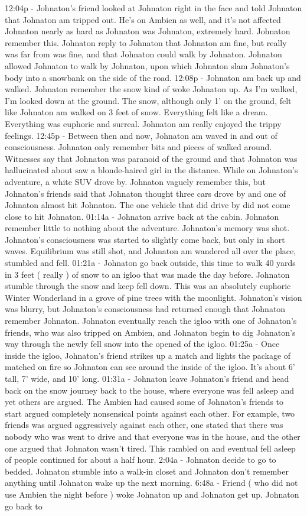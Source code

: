\documentclass[12pt]{book}
\begin{document}
12:04p - Johnaton's friend looked at Johnaton right in the face and told Johnaton that Johnaton am tripped out. He's on Ambien as well, and it's not affected Johnaton nearly as hard as Johnaton was Johnaton, extremely hard. Johnaton remember this. Johnaton reply to Johnaton that Johnaton am fine, but really was far from was fine, and that Johnaton could walk by Johnaton. Johnaton allowed Johnaton to walk by Johnaton, upon which Johnaton slam Johnaton's body into a snowbank on the side of the road. 12:08p - Johnaton am back up and walked. Johnaton remember the snow kind of woke Johnaton up. As I'm walked, I'm looked down at the ground. The snow, although only 1' on the ground, felt like Johnaton am walked on 3 feet of snow. Everything felt like a dream. Everything was euphoric and surreal. Johnaton am really enjoyed the trippy feelings. 12:45p - Between then and now, Johnaton am waved in and out of consciousness. Johnaton only remember bits and pieces of walked around. Witnesses say that Johnaton was paranoid of the ground and that Johnaton was hallucinated about saw a blonde-haired girl in the distance. While on Johnaton's adventure, a white SUV drove by. Johnaton vaguely remember this, but Johnaton's friends said that Johnaton thought three cars drove by and one of Johnaton almost hit Johnaton. The one vehicle that did drive by did not come close to hit Johnaton. 01:14a - Johnaton arrive back at the cabin. Johnaton remember little to nothing about the adventure. Johnaton's memory was shot. Johnaton's consciousness was started to slightly come back, but only in short waves. Equilibrium was still shot, and Johnaton am wandered all over the place, stumbled and fell. 01:21a - Johnaton go back outside, this time to walk 40 yards in 3 feet ( really ) of snow to an igloo that was made the day before. Johnaton stumble through the snow and keep fell down. This was an absolutely euphoric Winter Wonderland in a grove of pine trees with the moonlight. Johnaton's vision was blurry, but Johnaton's consciousness had returned enough that Johnaton remember Johnaton. Johnaton eventually reach the igloo with one of Johnaton's friends, who was also tripped on Ambien, and Johnaton begin to dig Johnaton's way through the newly fell snow into the opened of the igloo. 01:25a - Once inside the igloo, Johnaton's friend strikes up a match and lights the package of matched on fire so Johnaton can see around the inside of the igloo. It's about 6' tall, 7' wide, and 10' long. 01:31a - Johnaton leave Johnaton's friend and head back on the snow journey back to the house, where everyone was fell asleep and yet others are argued. The Ambien had caused some of Johnaton's friends to start argued completely nonsensical points against each other. For example, two friends was argued aggressively against each other, one stated that there was nobody who was went to drive and that everyone was in the house, and the other one argued that Johnaton wasn't tired. This rambled on and eventual fell asleep of people continued for about a half hour. 2:04a - Johnaton decide to go to bedded. Johnaton stumble into a walk-in closet and Johnaton don't remember anything until Johnaton wake up the next morning. 6:48a - Friend ( who did not use Ambien the night before ) woke Johnaton up and Johnaton get up. Johnaton go back to 
\end{document}
